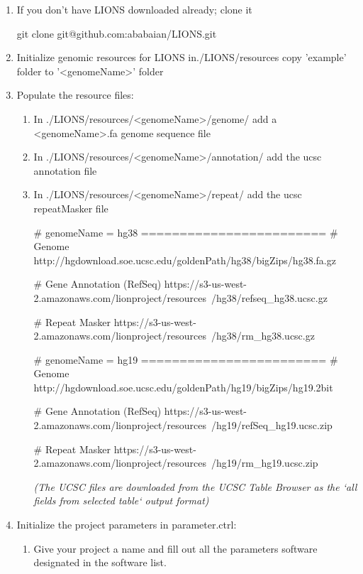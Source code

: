 \documentclass[11pt]{scrartcl}
\newcommand{\arrows}[1]{\textless #1\textgreater}
\begin{document}
\begin{enumerate}
\item If you don't have LIONS downloaded already; clone it
\begin{bash}
git clone git@github.com:ababaian/LIONS.git
\end{bash}

\item Initialize genomic resources for LIONS in./LIONS/resources copy 'example' folder to '\arrows{genomeName}' folder

\item Populate the resource files:
\begin{enumerate}
\item In ./LIONS/resources/\arrows{genomeName}/genome/ add a \arrows{genomeName}.fa genome sequence file
\item In ./LIONS/resources/\arrows{genomeName}/annotation/ add the ucsc annotation file
\item In ./LIONS/resources/\arrows{genomeName}/repeat/ add the ucsc repeatMasker file

\begin{bash}
# genomeName = hg38 ========================
# Genome
http://hgdownload.soe.ucsc.edu/goldenPath/hg38/bigZips/hg38.fa.gz

# Gene Annotation (RefSeq)
https://s3-us-west-2.amazonaws.com/lionproject/resources\
/hg38/refseq_hg38.ucsc.gz

# Repeat Masker
https://s3-us-west-2.amazonaws.com/lionproject/resources\
/hg38/rm_hg38.ucsc.gz
	
# genomeName = hg19 ========================
# Genome
http://hgdownload.soe.ucsc.edu/goldenPath/hg19/bigZips/hg19.2bit

# Gene Annotation (RefSeq)
https://s3-us-west-2.amazonaws.com/lionproject/resources\
/hg19/refSeq_hg19.ucsc.zip

# Repeat Masker
https://s3-us-west-2.amazonaws.com/lionproject/resources\
/hg19/rm_hg19.ucsc.zip	
	
\end{bash}

\textit{(The UCSC files are downloaded from the UCSC Table Browser as the `all fields from selected table` output format)}
\end{enumerate}


\item Initialize the project parameters in parameter.ctrl:
\begin{enumerate}
\item Give your project a name and fill out all the parameters
 software designated in the software list.
\end{enumerate}



\end{enumerate}
\end{document}

